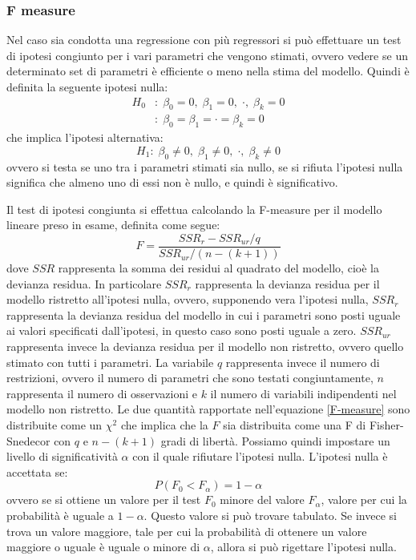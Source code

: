 \documentclass[]{article}
\begin{document}
\subsubsection{F measure}
Nel caso sia condotta una regressione con più regressori si può effettuare un test di ipotesi congiunto per i vari parametri che vengono stimati, ovvero vedere se un determinato set di parametri è efficiente o meno nella stima del modello. Quindi è definita la seguente ipotesi nulla:
\begin{equation}
\begin{split}
H_0 &: \; \beta_0 = 0 ,\; \beta_1 = 0,\; \cdot ,\; \beta_k = 0 \\
&:\; \beta_0 =  \beta_1 = \cdot = \beta_k = 0
\end{split}
\end{equation}
che implica l'ipotesi alternativa:
\begin{equation}
H_1: \; \beta_0 \neq 0 ,\; \beta_1 \neq 0,\; \cdot ,\; \beta_k \neq 0
\end{equation}
ovvero si testa se uno tra i parametri stimati sia nullo, se si rifiuta l'ipotesi nulla significa che almeno uno di essi non è nullo, e quindi è significativo.

Il test di ipotesi congiunta si effettua calcolando la F-measure per il modello lineare preso in esame, definita come segue:
\begin{equation}
F = \frac{SSR_r - SSR_{ur}/q}{SSR_{ur}/(n-(k+1))}
\label{F-measure}
\end{equation}
dove $SSR$ rappresenta la somma dei residui al quadrato del modello, cioè la devianza residua. In particolare $SSR_r$ rappresenta la devianza residua per il modello ristretto all'ipotesi nulla, ovvero, supponendo vera l'ipotesi nulla, $SSR_r$ rappresenta la devianza residua del modello in cui i parametri sono posti uguale ai valori specificati dall'ipotesi, in questo caso sono posti uguale a zero. $SSR_{ur}$ rappresenta invece la devianza residua per il modello non ristretto, ovvero quello stimato con tutti i parametri. La variabile $q$ rappresenta invece il numero di restrizioni, ovvero il numero di parametri che sono testati congiuntamente, $n$ rappresenta il numero di osservazioni e $k$ il numero di variabili indipendenti nel modello non ristretto. Le due quantità rapportate nell'equazione \eqref{F-measure} sono distribuite come un $\chi^2$ che implica che la $F$ sia distribuita come una F di Fisher-Snedecor con $q$ e $n-(k+1)$ gradi di libertà. Possiamo quindi impostare un livello di significatività $\alpha$ con il quale rifiutare l'ipotesi nulla. L'ipotesi nulla è accettata se:
\begin{equation}
P(F_0 < F_\alpha) = 1-\alpha
\end{equation}
ovvero se si ottiene un valore per il test $F_0$ minore del valore $F_\alpha$, valore per cui la probabilità è uguale a $1-\alpha$. Questo valore si può trovare tabulato. Se invece si trova un valore maggiore, tale per cui la probabilità di ottenere un valore maggiore o uguale è uguale o minore di $\alpha$, allora si può rigettare l'ipotesi nulla.
\end{document}
